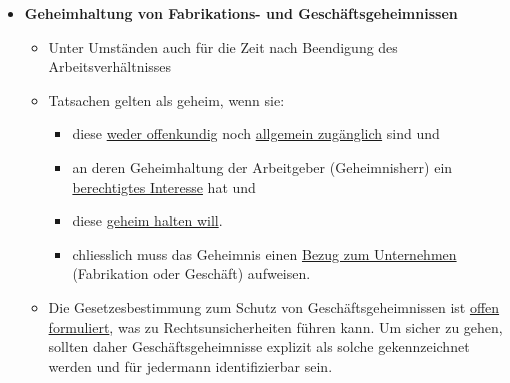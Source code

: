 \begin{itemize}
\begin{itemize}
\begin{itemize}
        \end{itemize}
    \end{itemize}
    \item \textbf{Geheimhaltung von Fabrikations- und Geschäftsgeheimnissen}
    \begin{itemize}
        \item Unter Umständen auch für die Zeit nach Beendigung des Arbeitsverhältnisses
        \item Tatsachen gelten als geheim, wenn sie:
        \begin{itemize}
            \item diese \underline{weder offenkundig} noch \underline{allgemein zugänglich} sind und
            \item an deren Geheimhaltung der Arbeitgeber (Geheimnisherr) ein \underline{berechtigtes Interesse} hat und
            \item diese \underline{geheim halten will}.
            \item chliesslich muss das Geheimnis einen \underline{Bezug zum Unternehmen} (Fabrikation oder Geschäft) aufweisen.
        \end{itemize}
        \item Die Gesetzesbestimmung zum Schutz von Geschäftsgeheimnissen ist \underline{offen formuliert}, was zu Rechtsunsicherheiten führen kann. Um sicher zu gehen, sollten daher Geschäftsgeheimnisse explizit als solche gekennzeichnet werden und für jedermann identifizierbar sein.
    \end{itemize}
\end{itemize}

